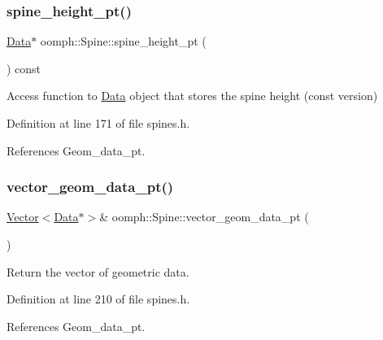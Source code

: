 \subsubsection{\texorpdfstring{spine\+\_\+height\+\_\+pt()}{spine\_height\_pt()}\hspace{0.1cm}{\footnotesize\ttfamily [2/2]}}
{\footnotesize\ttfamily \hyperlink{classoomph_1_1Data}{Data}$\ast$ oomph\+::\+Spine\+::spine\+\_\+height\+\_\+pt (\begin{DoxyParamCaption}{ }\end{DoxyParamCaption}) const\hspace{0.3cm}{\ttfamily [inline]}}



Access function to \hyperlink{classoomph_1_1Data}{Data} object that stores the spine height (const version) 



Definition at line 171 of file spines.\+h.



References Geom\+\_\+data\+\_\+pt.

\mbox{\label{classoomph_1_1Spine_a930bb511049f50d2a248277c5ffb7d68}} 
\subsubsection{\texorpdfstring{vector\+\_\+geom\+\_\+data\+\_\+pt()}{vector\_geom\_data\_pt()}}
{\footnotesize\ttfamily \hyperlink{classoomph_1_1Vector}{Vector}$<$\hyperlink{classoomph_1_1Data}{Data}$\ast$$>$\& oomph\+::\+Spine\+::vector\+\_\+geom\+\_\+data\+\_\+pt (\begin{DoxyParamCaption}{ }\end{DoxyParamCaption})\hspace{0.3cm}{\ttfamily [inline]}}



Return the vector of geometric data. 



Definition at line 210 of file spines.\+h.



References Geom\+\_\+data\+\_\+pt.

\mbox{\label{classoomph_1_1Spine_ace2513da519c1eb7a40fdac7bb803f0a}} 

